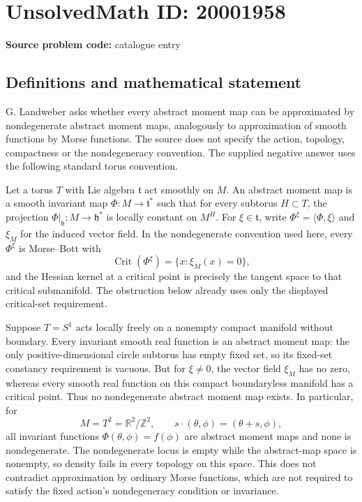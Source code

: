 \documentclass[11pt]{article}
\newcommand{\Z}{\mathbb{Z}}
\newcommand{\R}{\mathbb{R}}
\begin{document}
\section*{UnsolvedMath ID: 20001958}
\textbf{Source problem code:} catalogue entry
\subsection{Definitions and mathematical statement}
G. Landweber asks whether every abstract moment map can be approximated by nondegenerate abstract moment maps, analogously to approximation of smooth functions by Morse functions. The source does not specify the action, topology, compactness or the nondegeneracy convention. The supplied negative answer uses the following standard torus convention.

Let a torus \(T\) with Lie algebra \(\mathfrak t\) act smoothly on \(M\). An abstract moment map is a smooth invariant map \(\Phi:M\to\mathfrak t^*\) such that for every subtorus \(H\subset T\), the projection \(\Phi|_{\mathfrak h}:M\to\mathfrak h^*\) is locally constant on \(M^H\). For \(\xi\in\mathfrak t\), write \(\Phi^\xi=\langle\Phi,\xi\rangle\) and \(\xi_M\) for the induced vector field. In the nondegenerate convention used here, every \(\Phi^\xi\) is Morse--Bott with
\[
 \operatorname{Crit}(\Phi^\xi)=\{x:\xi_M(x)=0\},
\]
and the Hessian kernel at a critical point is precisely the tangent space to that critical submanifold. The obstruction below already uses only the displayed critical-set requirement.

Suppose \(T=S^1\) acts locally freely on a nonempty compact manifold without boundary. Every invariant smooth real function is an abstract moment map: the only positive-dimensional circle subtorus has empty fixed set, so its fixed-set constancy requirement is vacuous. But for \(\xi\ne0\), the vector field \(\xi_M\) has no zero, whereas every smooth real function on this compact boundaryless manifold has a critical point. Thus no nondegenerate abstract moment map exists. In particular, for
\[
 M=T^2=\R^2/\Z^2,\qquad
 s\cdot(\theta,\phi)=(\theta+s,\phi),
\]
all invariant functions \(\Phi(\theta,\phi)=f(\phi)\) are abstract moment maps and none is nondegenerate. The nondegenerate locus is empty while the abstract-map space is nonempty, so density fails in every topology on this space. This does not contradict approximation by ordinary Morse functions, which are not required to satisfy the fixed action's nondegeneracy condition or invariance.
\end{document}
